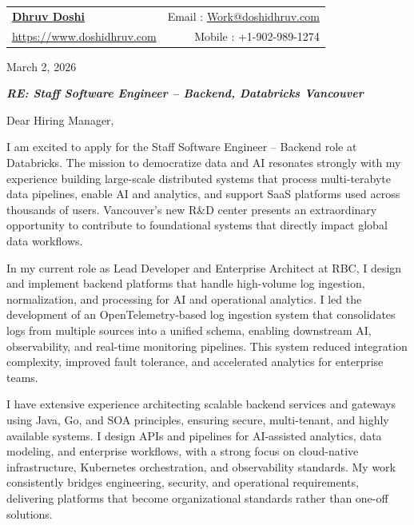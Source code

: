 \documentclass[letterpaper, 11pt]{article}
\begin{document}
\begin{tabular*}{\textwidth}{l@{\extracolsep{\fill}}r}
    \textbf{\href{http://doshidhruv.com/}{\Large Dhruv Doshi}} & Email : \href{mailto:Work@doshidhruv.com}{Work@doshidhruv.com} \\
    \href{https://doshidhruv.com/}{https://www.doshidhruv.com} & Mobile : +1-902-989-1274 \\
\end{tabular*}

\hrulefill

\bigbreak
March 2, 2026

\bigbreak

\textit{\textbf{RE: Staff Software Engineer – Backend, Databricks Vancouver}}

\bigbreak

Dear Hiring Manager,

\bigbreak

I am excited to apply for the Staff Software Engineer – Backend role at Databricks. The mission to democratize data and AI resonates strongly with my experience building large-scale distributed systems that process multi-terabyte data pipelines, enable AI and analytics, and support SaaS platforms used across thousands of users. Vancouver’s new R&D center presents an extraordinary opportunity to contribute to foundational systems that directly impact global data workflows.

\bigbreak

In my current role as Lead Developer and Enterprise Architect at RBC, I design and implement backend platforms that handle high-volume log ingestion, normalization, and processing for AI and operational analytics. I led the development of an OpenTelemetry-based log ingestion system that consolidates logs from multiple sources into a unified schema, enabling downstream AI, observability, and real-time monitoring pipelines. This system reduced integration complexity, improved fault tolerance, and accelerated analytics for enterprise teams.

\bigbreak

I have extensive experience architecting scalable backend services and gateways using Java, Go, and SOA principles, ensuring secure, multi-tenant, and highly available systems. I design APIs and pipelines for AI-assisted analytics, data modeling, and enterprise workflows, with a strong focus on cloud-native infrastructure, Kubernetes orchestration, and observability standards. My work consistently bridges engineering, security, and operational requirements, delivering platforms that become organizational standards rather than one-off solutions.
\end{document}
